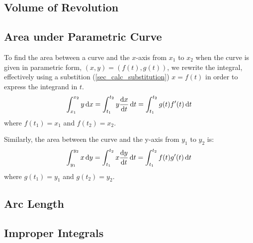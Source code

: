 \subsection{Volume of Revolution}

\subsection{Area under Parametric Curve} \label{sec_calc_parametric_area}

To find the area between a curve and the \(x\)-axis from \(x_1\) to \(x_2\)
when the curve is given in parametric form, \((x, y) = (f(t), g(t))\),
we rewrite the integral, effectively using a substition
(\ref{sec_calc_substitution}) \(x = f(t)\) in order to express the integrand
in \(t\).
\begin{equation}
\int_{x_1}^{x_2} y \dd{x} =
 \int_{t_1}^{t_2} y \dv{x}{t} \dd{t} =
 \int_{t_1}^{t_2} g(t)f'(t) \dd{t}
\end{equation}
where \(f(t_1) = x_1\) and \(f(t_2) = x_2\).

Similarly, the area between the curve and the y-axis from \(y_1\) to \(y_2\)
is:
\begin{equation}
\int_{y_1}^{y_2} x \dd{y} =
 \int_{t_1}^{t_2} x \dv{y}{t} \dd{t} =
 \int_{t_1}^{t_2} f(t)g'(t) \dd{t}
\end{equation}
where \(g(t_1) = y_1\) and \(g(t_2) = y_2\).

\subsection{Arc Length}

\subsection{Improper Integrals}

